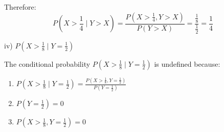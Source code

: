 \documentclass{article}
\begin{document}
        Therefore:
        \[
            P(X > \frac{1}{4} \mid Y > X) = \frac{P(X > \frac{1}{4}, Y > X)}{P(Y > X)} = \frac{\frac{1}{8}}{\frac{1}{2}} = \frac{1}{4}
        \]

        iv) $P(X > \frac{1}{8} \mid Y = \frac{1}{2})$

        The conditional probability $P(X > \frac{1}{8} \mid Y = \frac{1}{2})$ is undefined because:
        \begin{enumerate}
            \item $P(X > \frac{1}{8} \mid Y = \frac{1}{2}) = \frac{P(X > \frac{1}{8}, Y = \frac{1}{2})}{P(Y = \frac{1}{2})}$
            \item $P(Y = \frac{1}{2}) = 0$
            \item $P(X > \frac{1}{8}, Y = \frac{1}{2}) = 0$
        \end{enumerate}
\end{document}
